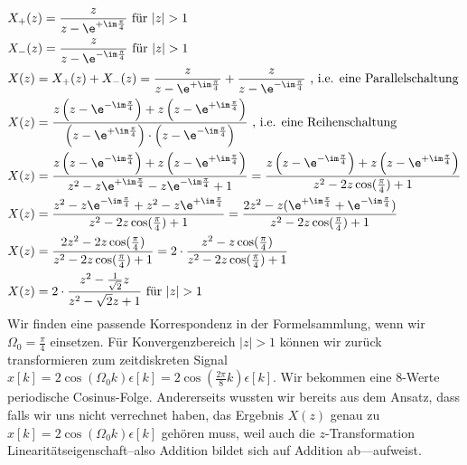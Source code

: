 \begin{ExCalc}
\begin{align}
&X_+(z) = \frac{z}{z-\e^{+\im\frac{\pi}{4}}}\text{ für } |z|>1 \\
&X_-(z) = \frac{z}{z-\e^{-\im\frac{\pi}{4}}}\text{ für } |z|>1 \\
&X(z) = X_+(z) + X_-(z) = \frac{z}{z-\e^{+\im\frac{\pi}{4}}} + \frac{z}{z-\e^{-\im\frac{\pi}{4}}}\text{ , i.e. eine Parallelschaltung}\\
&X(z) = \frac{z \left(z-\e^{-\im\frac{\pi}{4}}\right) + z \left(z-\e^{+\im\frac{\pi}{4}}\right)}
{\left(z-\e^{+\im\frac{\pi}{4}}\right)\cdot \left(z-\e^{-\im\frac{\pi}{4}}\right)}\text{ , i.e. eine Reihenschaltung}\\
&X(z)  = \frac{z \left(z-\e^{-\im\frac{\pi}{4}}\right) + z \left(z-\e^{+\im\frac{\pi}{4}}\right)}
{z^2 - z \e^{+\im\frac{\pi}{4}} - z \e^{-\im\frac{\pi}{4}} + 1}=
\frac{z \left(z-\e^{-\im\frac{\pi}{4}}\right) + z \left(z-\e^{+\im\frac{\pi}{4}}\right)}
{z^2 - 2 z \cos(\frac{\pi}{4}) + 1}\\
&X(z) = \frac{z^2 - z \e^{-\im\frac{\pi}{4}} + z^2 - z \e^{+\im\frac{\pi}{4}}}
{z^2 - 2 z \cos(\frac{\pi}{4}) + 1} =
\frac{2 z^2 - z (\e^{+\im\frac{\pi}{4}} + \e^{-\im\frac{\pi}{4}} )}
{z^2 - 2 z \cos(\frac{\pi}{4}) + 1}\\
&X(z) =\frac{2 z^2 - 2 z \cos(\frac{\pi}{4})}{z^2 - 2 z \cos(\frac{\pi}{4}) + 1}=
2 \cdot \frac{z^2 - z \cos(\frac{\pi}{4})}{z^2 - 2 z \cos(\frac{\pi}{4}) + 1}\\
&X(z) = 2 \cdot \frac{z^2-\frac{1}{\sqrt{2}} z}{z^2-\sqrt{2} z +1}\text{ für } |z|>1
\end{align}
%
Wir finden eine passende Korrespondenz in der Formelsammlung, wenn wir
$\Omega_0=\frac{\pi}{4}$ einsetzen. Für Konvergenzbereich $|z|>1$ können wir
zurück transformieren zum zeitdiskreten Signal
$x[k] = 2\cos(\Omega_0 k) \epsilon[k] = 2 \cos(\frac{2\pi}{8} k) \epsilon[k]$.
Wir bekommen eine 8-Werte periodische Cosinus-Folge.
%
Andererseits wussten wir bereits aus dem Ansatz, dass falls wir uns nicht
verrechnet haben, das Ergebnis $X(z)$ genau zu
$x[k] = 2\cos(\Omega_0 k) \epsilon[k]$ gehören muss,
weil auch die $z$-Transformation Linearitätseigenschaft--also Addition bildet sich
auf Addition ab---aufweist.


\end{ExCalc}
